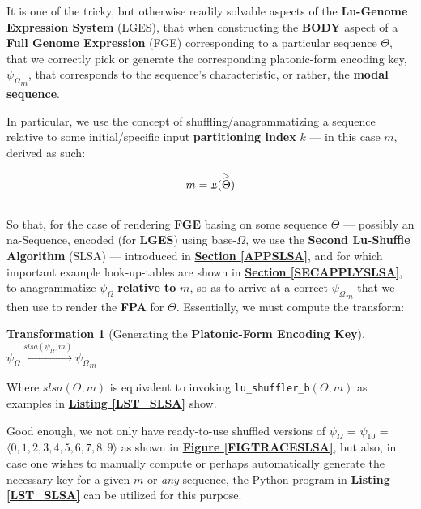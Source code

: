 \documentclass[a4paper, 18pt]{book} %
\newtheorem{trans}{Transformation}
\newcommand{\invpi}{\rotatebox[origin=c]{180}{$\pi$}}
\begin{document}
\begin{appendices}
It is one of the tricky, but otherwise readily solvable aspects of the \textbf{Lu-Genome Expression System} (LGES), that when constructing the \textbf{BODY} aspect of a \textbf{Full Genome Expression} (FGE) corresponding to a particular sequence $\Theta$, that we correctly pick or generate the corresponding platonic-form encoding key, $\boxed{\psi_\Omega}_m$, that corresponds to the sequence's characteristic, or rather, the \textbf{modal sequence}. 


In particular, we use the concept of shuffling/anagrammatizing a sequence relative to some initial/specific input \textbf{partitioning index} $k$ --- in this case $m$, derived as such:

\begin{equation}
 m = \invpi(\overset{>}{\Theta})
\end{equation}\\

So that, for the case of rendering \textbf{FGE} basing on some sequence $\Theta$ --- possibly an na-Sequence, encoded (for \textbf{LGES}) using base-$\Omega$, we use the \textbf{Second Lu-Shuffle Algorithm} (SLSA) --- introduced in \textbf{\hyperref[APPSLSA]{Section \ref{APPSLSA}}}, and for which important example look-up-tables are shown in \textbf{\hyperref[SECAPPLYSLSA]{Section \ref{SECAPPLYSLSA}}}, to anagrammatize $\psi_\Omega$ \textbf{relative to} $m$, so as to arrive at a correct $\boxed{\psi_\Omega}_m$ that we then use to render the \textbf{FPA} for $\Theta$. Essentially, we must compute the transform:\\


\begin{trans}[Generating the \textbf{Platonic-Form Encoding Key}]
$ $\\
$\psi_\Omega \xrightarrow{slsa(\psi_\Omega, m)} \boxed{\psi_\Omega}_m$\\
\end{trans}
 
Where $slsa(\Theta,m)$ is equivalent to invoking \texttt{lu\_shuffler\_b$(\Theta,m)$} as examples in \textbf{\hyperref[LST_SLSA]{Listing \ref{LST_SLSA}}} show. 

Good enough, we not only have ready-to-use shuffled versions of $\psi_\Omega$ = $\psi_{10}$ = $\langle 0, 1, 2, 3, 4, 5, 6, 7, 8, 9 \rangle$ as shown in \textbf{\hyperref[FIGTRACESLSA]{Figure \ref{FIGTRACESLSA}}}, but also, in case one wishes to manually compute or perhaps automatically generate the necessary key for a given $m$ or \textit{any} sequence, the Python program in \textbf{\hyperref[LST_SLSA]{Listing \ref{LST_SLSA}}} can be utilized for this purpose.
 


\end{appendices}
\end{document}

